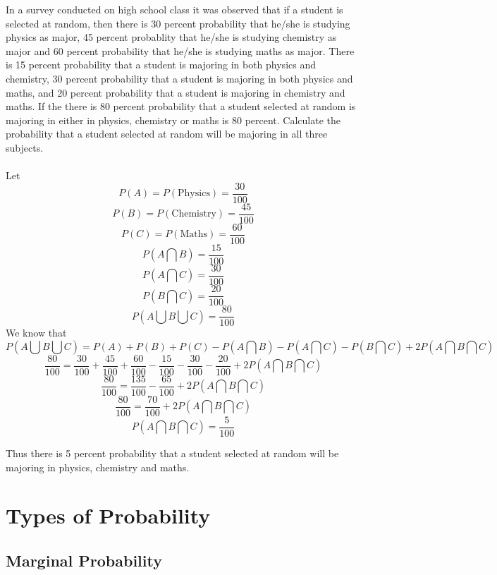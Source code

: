 \documentclass[twoside,12pt]{report}  %
\begin{document}
\vfill
\pagebreak

\begin{tcolorbox}[colback=blue!5!white, colframe=blue!75!black, title = \textbf{Union and Intersection of Three Sets}]
	In a survey conducted on high school class it was observed that if a student is selected at random, then there is 30 percent probability that he/she is studying  physics as major, 45 percent probablity that he/she is studying chemistry as major and 60 percent probability that he/she is studying maths as major. There is 15 percent probability that a student is majoring in both physics and chemistry, 30 percent probability that a student is majoring in both physics and maths, and 20 percent probability that a student is majoring in chemistry and maths. If the there is 80 percent probability that a student selected at random is majoring in either in physics, chemistry or maths is 80 percent. Calculate the probability that a student selected at random will be majoring in all three subjects.
	\\
	\\
	Let
	$$ P(A) = P(\mbox{Physics}) = \frac{30}{100} $$
	$$ P(B) = P(\mbox{Chemistry}) = \frac{45}{100} $$
	$$ P(C) = P(\mbox{Maths}) = \frac{60}{100} $$
	$$ P(A \bigcap B) = \frac{15}{100} $$
	$$ P(A \bigcap C) = \frac{30}{100} $$
	$$ P(B \bigcap C) = \frac{20}{100} $$
	$$ P(A \bigcup B \bigcup C) = \frac{80}{100} $$
	We know that
	$$ P(A \bigcup B \bigcup C) =  P(A) + P(B) + P(C) - P(A \bigcap B) - P(A \bigcap C) - P(B \bigcap C) + 2P(A \bigcap B \bigcap  C) $$
	$$ \frac{80}{100} = \frac{30}{100} + \frac{45}{100} + \frac{60}{100} - \frac{15}{100} - \frac{30}{100} - \frac{20}{100} + 2P(A \bigcap B \bigcap C) $$
	$$ \frac{80}{100} = \frac{135}{100} - \frac{65}{100} + 2P(A \bigcap B \bigcap C) $$
	$$ \frac{80}{100} = \frac{70}{100} + 2P(A \bigcap B \bigcap C) $$
	$$P(A \bigcap B \bigcap C) = \frac{5}{100}$$
	
	Thus there is 5 percent probability that a student selected at random will be majoring in physics, chemistry and maths.
\end{tcolorbox}

\vfill
\pagebreak

\section{Types of Probability}

\subsection{Marginal Probability}
\end{document}
